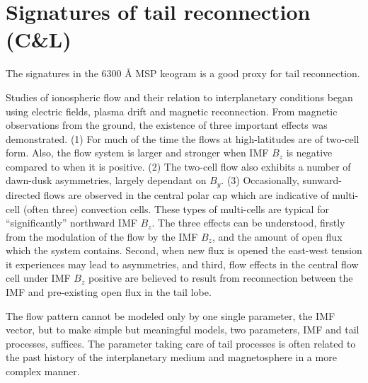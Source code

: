 \section[Signatures of tail reconnection]{Signatures of tail reconnection (C\&L)}
The signatures in the 6300 Å MSP keogram is a good proxy for tail reconnection.

Studies of ionospheric flow and their relation to interplanetary conditions began using electric fields, plasma drift and magnetic reconnection. From magnetic observations from the ground, the existence of three important effects was demonstrated. (1) For much of the time the flows at high-latitudes are of two-cell form. Also, the flow system is larger and stronger when IMF \(B_z\) is negative compared to when it is positive. (2) The two-cell flow also exhibits a number of dawn-dusk asymmetries, largely dependant on \(B_y\). (3) Occasionally, sunward-directed flows are observed in the central polar cap which are indicative of multi-cell (often three) convection cells. These types of multi-cells are typical for ``significantly'' northward IMF \(B_z\). The three effects can be understood, firstly from the modulation of the flow by the IMF \(B_z\), and the amount of open flux which the system contains. Second, when new flux is opened the east-west tension it experiences may lead to asymmetries, and third, flow effects in the central flow cell under IMF \(B_z\) positive are believed to result from reconnection between the IMF and pre-existing open flux in the tail lobe.

The flow pattern cannot be modeled only by one single parameter, the IMF vector, but to make simple but meaningful models, two parameters, IMF and tail processes, suffices. The parameter taking care of tail processes is often related to the past history of the interplanetary medium and magnetosphere in a more complex manner.

